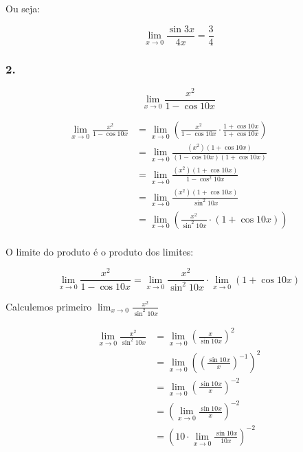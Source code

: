 \documentclass{article}
\begin{document}
Ou seja:

\[
    \lim_{x \to 0} \frac{\sin 3x}{4x}
    = \frac{3}{4}
\]

\subsubsection*{2.}

\[
    \lim_{x \to 0} \frac{x^2}{1 - \cos 10x}
\]






\begin{align*}
    \lim_{x \to 0} \frac{x^2}{1 - \cos 10x}
     & = \lim_{x \to 0} \left( \frac{x^2}{1 - \cos 10x} \cdot \frac{1 + \cos 10x}{1 + \cos 10x}  \right) \\
     & = \lim_{x \to 0} \frac{(x^2)(1 + \cos 10x)}{(1 - \cos 10x)(1 + \cos 10x)}                         \\
     & = \lim_{x \to 0} \frac{(x^2)(1 + \cos 10x)}{1 - \cos^2 10x}                                       \\
     & = \lim_{x \to 0} \frac{(x^2)(1 + \cos 10x)}{\sin^2 10x}                                           \\
     & = \lim_{x \to 0} \left(\frac{x^2}{\sin^2 10x} \cdot (1 + \cos 10x) \right)                        \\
\end{align*}

O limite do produto é o produto dos limites:

\begin{equation} \label{question_2_product_limit}
    \lim_{x \to 0} \frac{x^2}{1 - \cos 10x}
    =  \lim_{x \to 0} \frac{x^2}{\sin^2 10x} \cdot \lim_{x \to 0}(1 + \cos 10x)
\end{equation}



Calculemos primeiro \(\lim_{x \to 0} \frac{x^2}{\sin^2 10x}\)

\begin{align*}
    \lim_{x \to 0} \frac{x^2}{\sin^2 10x}
     & = \lim_{x \to 0} \left(\frac{x}{\sin 10x}\right)^2                   \\
     & = \lim_{x \to 0} \left(\left(\frac{\sin 10x}{x}\right)^{-1}\right)^2 \\
     & = \lim_{x \to 0} \left(\frac{\sin 10x}{x}\right)^{-2}                \\
     & =  \left( \lim_{x \to 0} \frac{\sin 10x}{x}\right)^{-2}              \\
     & =  \left( 10 \cdot \lim_{x \to 0} \frac{\sin 10x}{10x}\right)^{-2}   \\
\end{align*}
\end{document}
